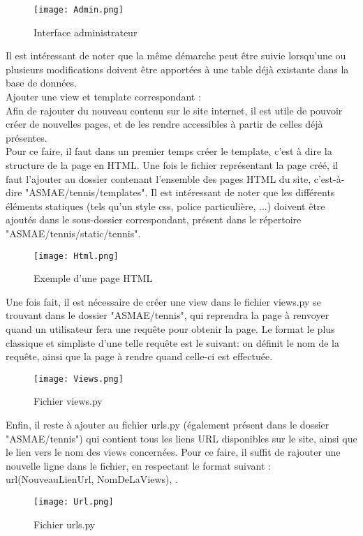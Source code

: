 \begin{figure}[H]
\centering
\texttt{[image: Admin.png]}
\caption{Interface administrateur}
\end{figure}

Il est intéressant de noter que la même démarche peut être suivie lorsqu'une ou plusieurs modifications doivent être apportées à une table déjà existante dans la base de données.\\

Ajouter une view et template correspondant :\\

Afin de rajouter du nouveau contenu sur le site internet, il est utile de pouvoir créer de nouvelles pages, et de les rendre accessibles à partir de celles déjà présentes.\\

Pour ce faire, il faut dans un premier temps créer le template, c'est à dire la structure de la page en HTML. Une fois le fichier représentant la page créé, il faut l'ajouter au dossier contenant l'ensemble des pages HTML du site, c'est-à-dire "ASMAE/tennis/templates". Il est intéressant de noter que les différents éléments statiques (tels qu'un style css, police particulière, ...) doivent être ajoutés dans le sous-dossier correspondant, présent dans le répertoire "ASMAE/tennis/static/tennis".\\

\begin{figure}[H]
\centering
\texttt{[image: Html.png]}
\caption{Exemple d'une page HTML}
\end{figure}

Une fois fait, il est nécessaire de créer une view dans le fichier views.py se trouvant dans le dossier "ASMAE/tennis", qui reprendra la page à renvoyer quand un utilisateur fera une requête pour obtenir la page. Le format le plus classique et simpliste d'une telle requête est le suivant: on définit le nom de la requête, ainsi que la page à rendre quand celle-ci est effectuée.\\

\begin{figure}[H]
\centering
\texttt{[image: Views.png]}
\caption{Fichier views.py}
\end{figure}

Enfin, il reste à ajouter au fichier urls.py (également présent dans le dossier "ASMAE/tennis") qui contient tous les liens URL disponibles sur le site, ainsi que le lien vers le nom des views concernées. Pour ce faire, il suffit de rajouter une nouvelle ligne dans le fichier, en respectant le format suivant : url(NouveauLienUrl, NomDeLaViews), .

\begin{figure}[H]
\centering
\texttt{[image: Url.png]}
\caption{Fichier urls.py}
\end{figure}
